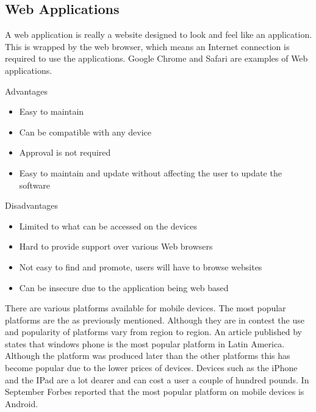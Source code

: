 \subsection{Web Applications}

A web application is really a website designed to look and feel like an 
application. This is wrapped by the web browser, which means an Internet
connection is required to use the applications. Google Chrome and Safari are 
examples of Web applications.

Advantages

\begin{itemize}
  \item Easy to maintain
  \item Can be compatible with any device
  \item Approval is not required
  \item Easy to maintain and update without affecting the user to update the
  software
\end{itemize}

Disadvantages

\begin{itemize}
  \item Limited to what can be accessed on the devices
  \item Hard to provide support over various Web browsers
  \item Not easy to find and promote, users will have to browse websites
  \item Can be insecure due to the application being web based
\end{itemize}

There are various platforms available for mobile devices. The most popular
platforms are the as previously mentioned. Although they are in contest the use
and popularity of platforms vary from region to region. An article published by
\citet{wpcentral13} states that windows phone is the most popular platform in
Latin America. Although the platform was produced later than the other platforms
this has become popular due to the lower prices of devices. Devices such as the
iPhone and the IPad are a lot dearer and can cost a user a couple of hundred
pounds. In September Forbes reported that the most popular platform on mobile
devices is Android.

